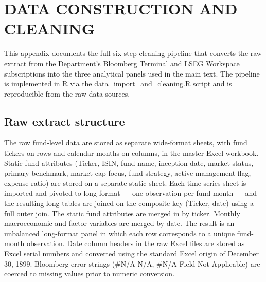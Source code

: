 \documentclass[12pt, oneside]{report}
\renewcommand{\cftchappresnum}{CHAPTER~}
\begin{document}
\addtocontents{toc}{\protect\renewcommand{\protect\cftchappresnum}{APPENDIX~}}
\renewcommand{\cftchappresnum}{APPENDIX~}
\setlength{\cftchapnumwidth}{7.5em}

\chapter{DATA CONSTRUCTION AND CLEANING}
\label{app:data_cleaning}

\noindent This appendix documents the full six-step cleaning pipeline that
converts the raw extract from the Department's Bloomberg Terminal and
LSEG Workspace subscriptions into the three analytical panels used in
the main text. The pipeline is implemented in R via the
data\_import\_and\_cleaning.R script and is reproducible from
the raw data sources.

\section{Raw extract structure}
\label{sec:raw_extract}

\noindent The raw fund-level data are stored as separate wide-format
sheets, with fund tickers on rows and calendar months on columns, in
the master Excel workbook. Static fund attributes (Ticker, ISIN, fund
name, inception date, market status, primary benchmark, market-cap
focus, fund strategy, active management flag, expense ratio) are
stored on a separate static sheet. Each time-series sheet is
imported and pivoted to long format --- one observation per fund-month
--- and the resulting long tables are joined on the composite key
(Ticker, date) using a full outer join. The static fund attributes are
merged in by ticker. Monthly macroeconomic and factor variables are
merged by date. The result is an unbalanced long-format panel in which
each row corresponds to a unique fund-month observation. Date column
headers in the raw Excel files are stored as Excel serial numbers and
converted using the standard Excel origin of December 30, 1899. Bloomberg
error strings (\#N/A N/A, \#N/A Field Not Applicable)
are coerced to missing values prior to numeric conversion.
\end{document}
